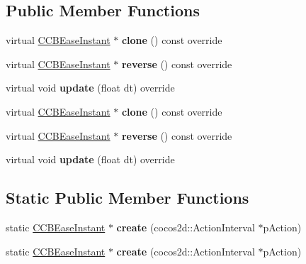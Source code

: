 \subsection*{Public Member Functions}
\begin{DoxyCompactItemize}
\item 
\mbox{\label{classcocosbuilder_1_1CCBEaseInstant_a1d00fe4f95c756d680700ad4c139a9de}} 
virtual \hyperlink{classcocosbuilder_1_1CCBEaseInstant}{C\+C\+B\+Ease\+Instant} $\ast$ {\bfseries clone} () const override
\item 
\mbox{\label{classcocosbuilder_1_1CCBEaseInstant_ad9ec158718406e834564ede1d6d79d8a}} 
virtual \hyperlink{classcocosbuilder_1_1CCBEaseInstant}{C\+C\+B\+Ease\+Instant} $\ast$ {\bfseries reverse} () const override
\item 
\mbox{\label{classcocosbuilder_1_1CCBEaseInstant_a78b896da83b48f70603e5cda0ef9527c}} 
virtual void {\bfseries update} (float dt) override
\item 
\mbox{\label{classcocosbuilder_1_1CCBEaseInstant_a02d27a491fdd75596eb61651a2eba9e1}} 
virtual \hyperlink{classcocosbuilder_1_1CCBEaseInstant}{C\+C\+B\+Ease\+Instant} $\ast$ {\bfseries clone} () const override
\item 
\mbox{\label{classcocosbuilder_1_1CCBEaseInstant_a388fc1c2dac4c04b7b6b8df315025559}} 
virtual \hyperlink{classcocosbuilder_1_1CCBEaseInstant}{C\+C\+B\+Ease\+Instant} $\ast$ {\bfseries reverse} () const override
\item 
\mbox{\label{classcocosbuilder_1_1CCBEaseInstant_a613207c991e96d7cdf8bdc92ae0fe7b0}} 
virtual void {\bfseries update} (float dt) override
\end{DoxyCompactItemize}
\subsection*{Static Public Member Functions}
\begin{DoxyCompactItemize}
\item 
\mbox{\label{classcocosbuilder_1_1CCBEaseInstant_af49c6f25fe0480f496260f0336c9e28a}} 
static \hyperlink{classcocosbuilder_1_1CCBEaseInstant}{C\+C\+B\+Ease\+Instant} $\ast$ {\bfseries create} (cocos2d\+::\+Action\+Interval $\ast$p\+Action)
\item 
\mbox{\label{classcocosbuilder_1_1CCBEaseInstant_a995a349d0f543203027048686dfe1d6f}} 
static \hyperlink{classcocosbuilder_1_1CCBEaseInstant}{C\+C\+B\+Ease\+Instant} $\ast$ {\bfseries create} (cocos2d\+::\+Action\+Interval $\ast$p\+Action)
\end{DoxyCompactItemize}


